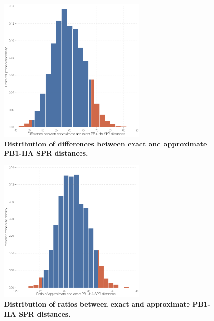 \documentclass[11pt,oneside,letterpaper]{article}
\begin{document}
\begin{figure}
\centering  
\includegraphics[width=0.65\textwidth]  {supp_figures/InfB_supp_PB1-HA_hist.png}
\caption{\textbf{Distribution of differences between exact and approximate PB1-HA SPR distances.}}
\label{SPR_PB1-HA_difference}
\end{figure}

\begin{figure}
\centering  
\includegraphics[width=0.65\textwidth]  {supp_figures/InfB_supp_PB1-HA_hist2.png}
\caption{\textbf{Distribution of ratios between exact and approximate PB1-HA SPR distances.}}
\label{SPR_PB1-HA_ratio}
\end{figure}
\end{document}
